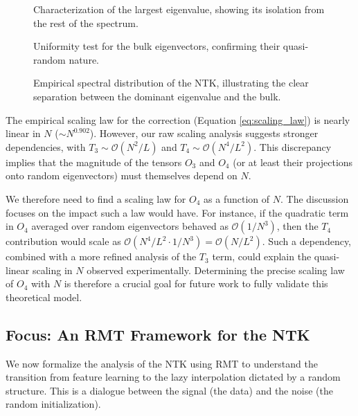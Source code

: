 \documentclass[a4paper]{article}
\begin{document}
\begin{figure}[h!]
    \centering
    \caption{Characterization of the largest eigenvalue, showing its isolation from the rest of the spectrum.}
    \label{fig:wk7_eig1}
\end{figure}

\begin{figure}[h!]
    \centering
    \caption{Uniformity test for the bulk eigenvectors, confirming their quasi-random nature.}
    \label{fig:wk7_uniformity}
\end{figure}

\begin{figure}[h!]
    \centering
    \caption{Empirical spectral distribution of the NTK, illustrating the clear separation between the dominant eigenvalue and the bulk.}
    \label{fig:wk7_spectrum_dist}
\end{figure}

The empirical scaling law for the correction (Equation \ref{eq:scaling_law}) is nearly linear in $N$ ($\sim N^{0.902}$). However, our raw scaling analysis suggests stronger dependencies, with $T_3 \sim \mathcal{O}(N^2/L)$ and $T_4 \sim \mathcal{O}(N^4/L^2)$. This discrepancy implies that the magnitude of the tensors $O_3$ and $O_4$ (or at least their projections onto random eigenvectors) must themselves depend on $N$.

We therefore need to find a scaling law for $O_4$ as a function of $N$. The discussion focuses on the impact such a law would have. For instance, if the quadratic term in $O_4$ averaged over random eigenvectors behaved as $\mathcal{O}(1/N^3)$, then the $T_4$ contribution would scale as $\mathcal{O}(N^4/L^2 \cdot 1/N^3) = \mathcal{O}(N/L^2)$. Such a dependency, combined with a more refined analysis of the $T_3$ term, could explain the quasi-linear scaling in $N$ observed experimentally. Determining the precise scaling law of $O_4$ with $N$ is therefore a crucial goal for future work to fully validate this theoretical model.

\subsection{Focus: An RMT Framework for the NTK}
We now formalize the analysis of the NTK using RMT to understand the transition from feature learning to the lazy interpolation dictated by a random structure. This is a dialogue between the signal (the data) and the noise (the random initialization).
\end{document}
